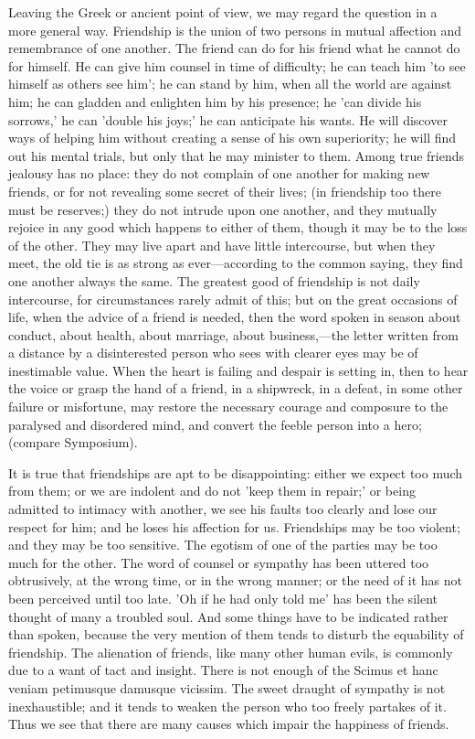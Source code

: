 \documentclass[11pt,letter]{article}
\begin{document}
\par  Leaving the Greek or ancient point of view, we may regard the question in a more general way. Friendship is the union of two persons in mutual affection and remembrance of one another. The friend can do for his friend what he cannot do for himself. He can give him counsel in time of difficulty; he can teach him 'to see himself as others see him'; he can stand by him, when all the world are against him; he can gladden and enlighten him by his presence; he 'can divide his sorrows,' he can 'double his joys;' he can anticipate his wants. He will discover ways of helping him without creating a sense of his own superiority; he will find out his mental trials, but only that he may minister to them. Among true friends jealousy has no place: they do not complain of one another for making new friends, or for not revealing some secret of their lives; (in friendship too there must be reserves;) they do not intrude upon one another, and they mutually rejoice in any good which happens to either of them, though it may be to the loss of the other. They may live apart and have little intercourse, but when they meet, the old tie is as strong as ever—according to the common saying, they find one another always the same. The greatest good of friendship is not daily intercourse, for circumstances rarely admit of this; but on the great occasions of life, when the advice of a friend is needed, then the word spoken in season about conduct, about health, about marriage, about business,—the letter written from a distance by a disinterested person who sees with clearer eyes may be of inestimable value. When the heart is failing and despair is setting in, then to hear the voice or grasp the hand of a friend, in a shipwreck, in a defeat, in some other failure or misfortune, may restore the necessary courage and composure to the paralysed and disordered mind, and convert the feeble person into a hero; (compare Symposium).

\par  It is true that friendships are apt to be disappointing: either we expect too much from them; or we are indolent and do not 'keep them in repair;' or being admitted to intimacy with another, we see his faults too clearly and lose our respect for him; and he loses his affection for us. Friendships may be too violent; and they may be too sensitive. The egotism of one of the parties may be too much for the other. The word of counsel or sympathy has been uttered too obtrusively, at the wrong time, or in the wrong manner; or the need of it has not been perceived until too late. 'Oh if he had only told me' has been the silent thought of many a troubled soul. And some things have to be indicated rather than spoken, because the very mention of them tends to disturb the equability of friendship. The alienation of friends, like many other human evils, is commonly due to a want of tact and insight. There is not enough of the Scimus et hanc veniam petimusque damusque vicissim. The sweet draught of sympathy is not inexhaustible; and it tends to weaken the person who too freely partakes of it. Thus we see that there are many causes which impair the happiness of friends.
\end{document}
